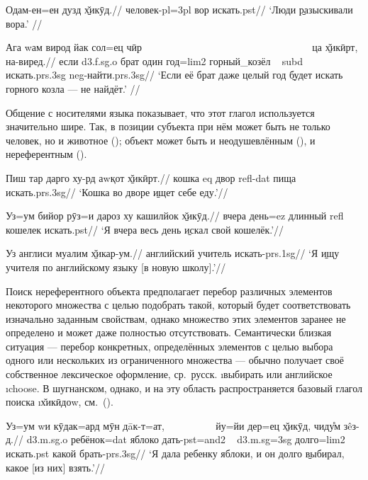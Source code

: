 \begingl
\gla Одам-ен=ен дузд \b{х̌икӯд}.//
\glc человек-{\sc pl=3pl} вор искать.{\sc pst}//
\glft ‘Люди \b{разыскивали} вора.’ //
\endgl \xe

\begingl
\gla Ага wам вирод йак сол=ец чӣр ~~~~~~~~~~~~~~~~~~~~~~~~~~~~~~~~~ ца \b{х̌икӣрт}, на-виред.//
\glc если {\sc d3.f.sg.o} брат один год={\sc lim2} горный\_козёл ~ {\sc subd} искать.{\sc prs.3sg} {\sc neg}-найти.{\sc prs.3sg}//
\glft ‘Если её брат даже целый год \b{будет искать} горного козла — не найдёт.’ //
\endgl \xe

Общение с носителями языка показывает, что этот глагол используется значительно шире. Так, в позиции субъекта при нём может быть не только человек, но и животное (); объект может быть и неодушевлённым (), и нереферентным ().

\begingl
\gla Пиш тар дарго ху-рд аwқот \b{х̌икӣрт}.//
\glc кошка {\sc eq} двор {\sc refl-dat} пища искать.{\sc prs.3sg}//
\glft ‘Кошка во дворе \b{ищет} себе еду.’//
\endgl \xe

\begingl
\gla Уз=ум бийор рӯз=и дароз ху кашилйок \b{х̌икӯд}.//
 вчера день={\sc ez} длинный {\sc refl} кошелек искать.{\sc pst}//
\glft ‘Я вчера весь день \b{искал} свой кошелёк.’//
\endgl \xe

\begingl
\gla Уз англиси муалим \b{х̌икар-ум}.//
 английский учитель искать-{\sc prs.1sg}//
\glft ‘Я \b{ищу} учителя по английскому языку [в новую школу].’//
\endgl \xe

Поиск нереферентного объекта предполагает перебор различных элементов некоторого множества с целью подобрать такой, который будет соответствовать изначально заданным свойствам, однако множество этих элементов заранее не определено и может даже полностью отсутствовать. Семантически близкая ситуация — перебор конкретных, определённых элементов с целью выбора одного или нескольких из ограниченного множества — обычно получает своё собственное лексическое оформление, ср.~русск. \i{выбирать} или английское \i{choose}. В шугнанском, однако, и на эту область распространяется базовый глагол поиска \i{х̌икӣдоw}, см.~().

\begingl
\gla Уз=ум wи кӯдак=ард мӯн дāк-т=ат, ~~~~~~~~~ йу=йи дер=ец \b{х̌икӯд}, чиду̊м зêз-д.//
 {\sc d3.m.sg.o} ребёнок={\sc dat} яблоко дать-{\sc pst=and2} ~ {\sc d3.m.sg=3sg} долго={\sc lim2} искать.{\sc pst} какой брать-{\sc prs.3sg}//
\glft ‘Я дала ребенку яблоки, и он долго \b{выбирал}, какое [из них] взять.’//
\endgl \xe

